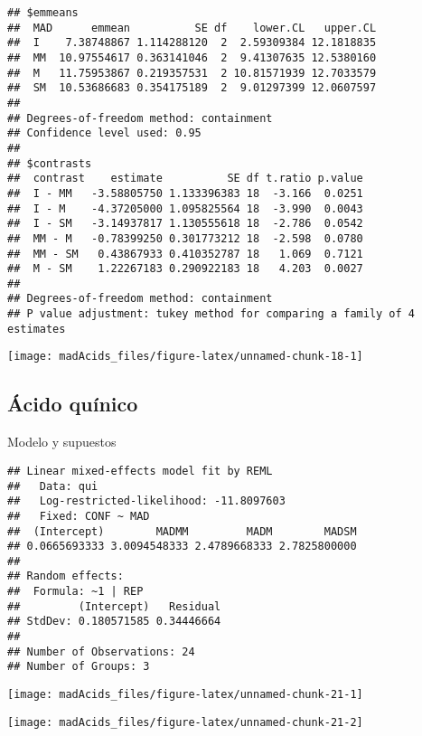 \documentclass[
]{article}
\begin{document}
\begin{verbatim}
## $emmeans
##  MAD      emmean          SE df    lower.CL   upper.CL
##  I    7.38748867 1.114288120  2  2.59309384 12.1818835
##  MM  10.97554617 0.363141046  2  9.41307635 12.5380160
##  M   11.75953867 0.219357531  2 10.81571939 12.7033579
##  SM  10.53686683 0.354175189  2  9.01297399 12.0607597
## 
## Degrees-of-freedom method: containment 
## Confidence level used: 0.95 
## 
## $contrasts
##  contrast    estimate          SE df t.ratio p.value
##  I - MM   -3.58805750 1.133396383 18  -3.166  0.0251
##  I - M    -4.37205000 1.095825564 18  -3.990  0.0043
##  I - SM   -3.14937817 1.130555618 18  -2.786  0.0542
##  MM - M   -0.78399250 0.301773212 18  -2.598  0.0780
##  MM - SM   0.43867933 0.410352787 18   1.069  0.7121
##  M - SM    1.22267183 0.290922183 18   4.203  0.0027
## 
## Degrees-of-freedom method: containment 
## P value adjustment: tukey method for comparing a family of 4 estimates
\end{verbatim}

\begin{center}\texttt{[image: madAcids\_files/figure-latex/unnamed-chunk-18-1]} \end{center}

\subsection{Ácido quínico}\label{uxe1cido-quuxednico}

Modelo y supuestos

\begin{verbatim}
## Linear mixed-effects model fit by REML
##   Data: qui 
##   Log-restricted-likelihood: -11.8097603
##   Fixed: CONF ~ MAD 
##  (Intercept)        MADMM         MADM        MADSM 
## 0.0665693333 3.0094548333 2.4789668333 2.7825800000 
## 
## Random effects:
##  Formula: ~1 | REP
##         (Intercept)   Residual
## StdDev: 0.180571585 0.34446664
## 
## Number of Observations: 24
## Number of Groups: 3
\end{verbatim}

\begin{center}\texttt{[image: madAcids\_files/figure-latex/unnamed-chunk-21-1]} \end{center}

\begin{center}\texttt{[image: madAcids\_files/figure-latex/unnamed-chunk-21-2]} \end{center}
\end{document}
